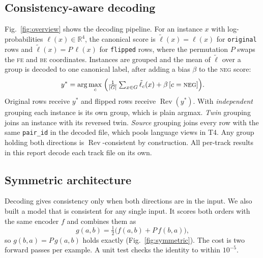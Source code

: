 \documentclass[conference]{IEEEtran}
\newcommand{\rev}{\operatorname{Rev}}
\newcommand{\FE}{\textsc{fe}}
\newcommand{\BE}{\textsc{be}}
\newcommand{\NEG}{\textsc{neg}}
\begin{document}
\subsection{Consistency-aware decoding}
Fig.~\ref{fig:overview} shows the decoding pipeline. For an instance $x$ with
log-probabilities $\ell(x)\in\mathbb{R}^4$, the canonical score is
$\tilde\ell(x)=\ell(x)$ for \texttt{original} rows and $\tilde\ell(x)=P\,\ell(x)$
for \texttt{flipped} rows, where the permutation $P$ swaps the \FE{} and \BE{}
coordinates. Instances are grouped and the mean of $\tilde\ell$ over a group
is decoded to one canonical label, after adding a bias $\beta$ to the \NEG{}
score:
\begin{equation}
  y^\ast = \arg\max_{c}\; \Bigl(\tfrac{1}{|G|}\textstyle\sum_{x\in G}\tilde\ell_c(x)
  + \beta\,[c=\NEG]\Bigr).
\end{equation}
Original rows receive $y^\ast$ and flipped rows receive $\rev(y^\ast)$. With
\emph{independent} grouping each instance is its own group, which is plain
argmax. \emph{Twin} grouping joins an instance with its reversed twin.
\emph{Source} grouping joins every row with the same \texttt{pair\_id} in the
decoded file, which pools language views in T4. Any group holding both
directions is $\rev$-consistent by construction. All per-track results in this
report decode each track file on its own.

\subsection{Symmetric architecture}
Decoding gives consistency only when both directions are in the input. We
also built a model that is consistent for any single input. It scores both
orders with the same encoder $f$ and combines them as
\begin{equation}
  g(a,b) = \tfrac12\bigl(f(a,b) + P\,f(b,a)\bigr),
\end{equation}
so $g(b,a)=P\,g(a,b)$ holds exactly (Fig.~\ref{fig:symmetric}). The cost is
two forward passes per example. A unit test checks the identity to within
$10^{-5}$.
\end{document}
